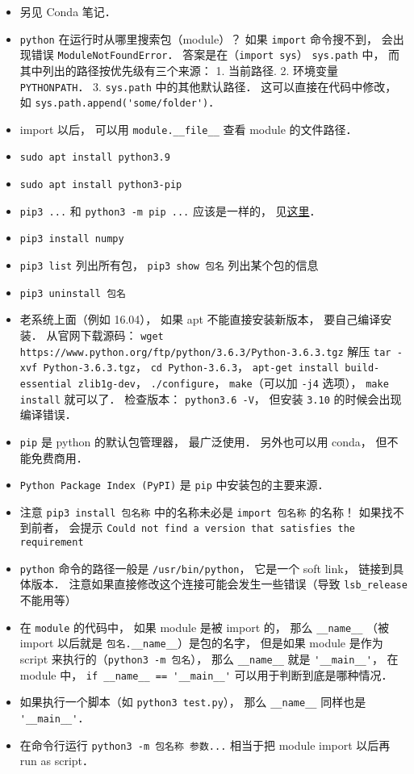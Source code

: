 

\begin{itemize}
\item 另见 Conda 笔记．
\item \verb|python| 在运行时从哪里搜索包（module）？ 如果 \verb|import| 命令搜不到， 会出现错误 \verb|ModuleNotFoundError|． 答案是在（\verb|import sys|） \verb|sys.path| 中， 而其中列出的路径按优先级有三个来源： 1. 当前路径. 2. 环境变量 \verb|PYTHONPATH|． 3. \verb|sys.path| 中的其他默认路径． 这可以直接在代码中修改， 如 \verb|sys.path.append('some/folder')|．
\item import 以后， 可以用 \verb|module.__file__| 查看 module 的文件路径．
\item \verb|sudo apt install python3.9|
\item \verb|sudo apt install python3-pip|
\item \verb|pip3 ...| 和 \verb|python3 -m pip ...| 应该是一样的， 见\href{https://stackoverflow.com/questions/41307101/difference-between-pip3-and-python3-m-pip}{这里}．
\item \verb|pip3 install numpy|
\item \verb|pip3 list| 列出所有包， \verb|pip3 show 包名| 列出某个包的信息
\item \verb|pip3 uninstall 包名|
\item 老系统上面（例如 16.04）， 如果 apt 不能直接安装新版本， 要自己编译安装． 从官网下载源码： \verb|wget https://www.python.org/ftp/python/3.6.3/Python-3.6.3.tgz| 解压 \verb|tar -xvf Python-3.6.3.tgz|， \verb|cd Python-3.6.3|， \verb|apt-get install build-essential zlib1g-dev|， \verb|./configure|， \verb|make|（可以加 \verb|-j4| 选项）， \verb|make install| 就可以了． 检查版本： \verb|python3.6 -V|， 但安装 \verb|3.10| 的时候会出现编译错误．
\item \verb|pip| 是 python 的默认包管理器， 最广泛使用． 另外也可以用 conda， 但不能免费商用．
\item \verb|Python Package Index (PyPI)| 是 \verb|pip| 中安装包的主要来源．
\item 注意 \verb|pip3 install 包名称| 中的名称未必是 \verb|import 包名称| 的名称！ 如果找不到前者， 会提示 \verb|Could not find a version that satisfies the requirement|
\item \verb|python| 命令的路径一般是 \verb|/usr/bin/python|， 它是一个 soft link， 链接到具体版本． 注意如果直接修改这个连接可能会发生一些错误（导致 \verb|lsb_release| 不能用等）
\item 在 \verb|module| 的代码中， 如果 module 是被 import 的， 那么 \verb|__name__| （被 import 以后就是 \verb|包名.__name__|）是包的名字， 但是如果 module 是作为 script 来执行的（\verb|python3 -m 包名|）， 那么 \verb|__name__| 就是 \verb|'__main__'|， 在 module 中， \verb|if __name__ == '__main__'| 可以用于判断到底是哪种情况．
\item 如果执行一个脚本（如 \verb|python3 test.py|）， 那么 \verb|__name__| 同样也是 \verb|'__main__'|．
\item 在命令行运行 \verb|python3 -m 包名称 参数...| 相当于把 module import 以后再 run as script．
\end{itemize}
